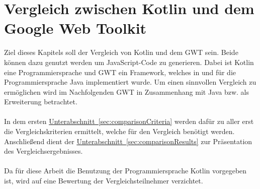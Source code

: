
\chapter{Vergleich zwischen Kotlin und dem Google Web Toolkit}
Ziel dieses Kapitels soll der Vergleich von Kotlin und dem \gls{GWT} sein. Beide können dazu genutzt werden um JavaScript-Code zu generieren. Dabei ist Kotlin eine Programmiersprache und \gls{GWT} ein Framework, welches in und für die Programmiersprache Java implementiert wurde. Um einen sinnvollen Vergleich zu ermöglichen wird im Nachfolgenden \gls{GWT} in Zusammenhang mit Java bzw. als Erweiterung betrachtet.\\
\\
In dem ersten \hyperref[sec:comparisonCriteria]{Unterabschnitt~\ref{sec:comparisonCriteria}} werden dafür zu aller erst die Vergleichskriterien ermittelt, welche für den Vergleich benötigt werden. Anschließend dient der \hyperref[sec:comparisonResults]{Unterabschnitt~\ref{sec:comparisonResults}} zur Präsentation des Vergleichsergebnisses.\\
\\
Da für diese Arbeit die Benutzung der Programmiersprache Kotlin vorgegeben ist, wird auf eine Bewertung der Vergleichsteilnehmer verzichtet.

